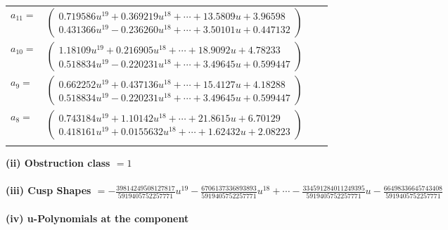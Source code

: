 \documentclass[1p]{elsarticle_modified}
\theoremstyle{definition}
\begin{document}
\begin{tabular}{m{7pt} m{180pt} m{7pt} m{180pt} }
\flushright $a_{11}=$&$\begin{pmatrix}0.719586 u^{19}+0.369219 u^{18}+\cdots+13.5809 u+3.96598\\0.431366 u^{19}-0.236260 u^{18}+\cdots+3.50101 u+0.447132\end{pmatrix}$ \\
\flushright $a_{10}=$&$\begin{pmatrix}1.18109 u^{19}+0.216905 u^{18}+\cdots+18.9092 u+4.78233\\0.518834 u^{19}-0.220231 u^{18}+\cdots+3.49645 u+0.599447\end{pmatrix}$ \\
\flushright $a_{9}=$&$\begin{pmatrix}0.662252 u^{19}+0.437136 u^{18}+\cdots+15.4127 u+4.18288\\0.518834 u^{19}-0.220231 u^{18}+\cdots+3.49645 u+0.599447\end{pmatrix}$ \\
\flushright $a_{8}=$&$\begin{pmatrix}0.743184 u^{19}+1.10142 u^{18}+\cdots+21.8615 u+6.70129\\0.418161 u^{19}+0.0155632 u^{18}+\cdots+1.62432 u+2.08223\end{pmatrix}$\\&\end{tabular}
\flushleft \textbf{(ii) Obstruction class $= 1$}\\~\\
\flushleft \textbf{(iii) Cusp Shapes $= -\frac{39814249508127817}{5919405752257771} u^{19}-\frac{6706137336893893}{5919405752257771} u^{18}+\cdots-\frac{334591284011249395}{5919405752257771} u-\frac{66498336645743408}{5919405752257771}$}\\~\\
\newpage\renewcommand{\arraystretch}{1}
\flushleft \textbf{(iv) u-Polynomials at the component}\newline \\
\end{document}
